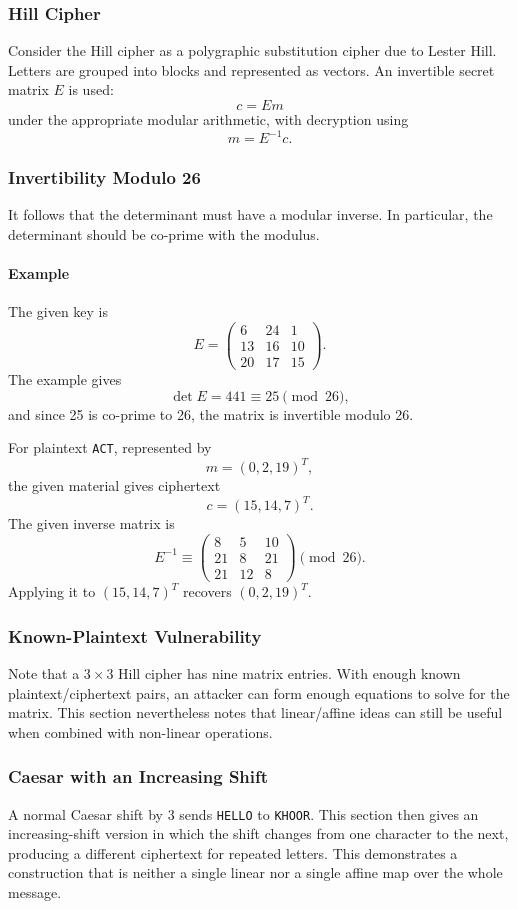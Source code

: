 \documentclass[12pt]{article}
\newcommand{\Example}{\paragraph{Example}}
\begin{document}
\subsubsection{Hill Cipher}
Consider the Hill cipher as a polygraphic substitution cipher due to Lester Hill. Letters are grouped into blocks and represented as vectors. An invertible secret matrix $E$ is used:
\[
c=Em
\]
under the appropriate modular arithmetic, with decryption using
\[
m=E^{-1}c.
\]

\subsubsection{Invertibility Modulo 26}
It follows that the determinant must have a modular inverse. In particular, the determinant should be co-prime with the modulus.

\Example The given key is
\[
E=
\begin{pmatrix}
6&24&1\\
13&16&10\\
20&17&15
\end{pmatrix}.
\]
The example gives
\[
\det E=441\equiv25\pmod{26},
\]
and since 25 is co-prime to 26, the matrix is invertible modulo 26.

For plaintext \texttt{ACT}, represented by
\[
m=(0,2,19)^T,
\]
the given material gives ciphertext
\[
c=(15,14,7)^T.
\]
The given inverse matrix is
\[
E^{-1}\equiv
\begin{pmatrix}
8&5&10\\
21&8&21\\
21&12&8
\end{pmatrix}\pmod{26}.
\]
Applying it to $(15,14,7)^T$ recovers $(0,2,19)^T$.

\subsubsection{Known-Plaintext Vulnerability}
Note that a $3\times3$ Hill cipher has nine matrix entries. With enough known plaintext/ciphertext pairs, an attacker can form enough equations to solve for the matrix. This section nevertheless notes that linear/affine ideas can still be useful when combined with non-linear operations.

\subsubsection{Caesar with an Increasing Shift}
A normal Caesar shift by 3 sends \texttt{HELLO} to \texttt{KHOOR}. This section then gives an increasing-shift version in which the shift changes from one character to the next, producing a different ciphertext for repeated letters. This demonstrates a construction that is neither a single linear nor a single affine map over the whole message.
\end{document}
